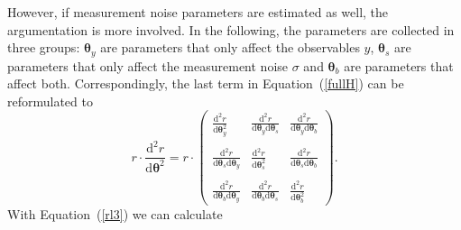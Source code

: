 \documentclass[12pt,a4paper]{scrartcl}
\newcommand{\DDsquare}[2]{\frac{\mathrm{d}^2 #1}{\mathrm{d} #2^2}}
\newcommand{\DDD}[3]{\frac{\mathrm{d}^2 #1}{\mathrm{d} #2\mathrm{d} #3}}
\begin{document}
However, if measurement noise parameters are estimated as well, the argumentation is 
more involved. In the following, the parameters are collected in three groups: $
\boldsymbol{\theta}_y$ are parameters that only affect the observables ${y}$, $
\boldsymbol{\theta}_s$ are parameters that only affect the measurement noise ${\sigma}$ 
and $\boldsymbol{\theta}_{b}$ are parameters that affect both. Correspondingly, the last 
term in Equation~(\ref{fullH}) can be reformulated to
\begin{displaymath}
{r} \cdot \DDsquare{{r}}{\boldsymbol{\theta}} = {r} \cdot \left( 
\begin{array}{ccc}
\DDsquare{{r}}{\boldsymbol{\theta}_y} & \DDD{{r}}{\boldsymbol{\theta}_y}
{\boldsymbol{\theta}_s} & \DDD{{r}}{\boldsymbol{\theta}_y}{\boldsymbol{\theta}_b} \\
\\
\DDD{{r}}{\boldsymbol{\theta}_s}{\boldsymbol{\theta}_y} & \DDsquare{{r}}
{\boldsymbol{\theta}_s} & \DDD{{r}}{\boldsymbol{\theta}_s}{\boldsymbol{\theta}_b} \\
\\
\DDD{{r}}{\boldsymbol{\theta}_b}{\boldsymbol{\theta}_y} & \DDD{{r}}{\boldsymbol{\theta}
_b}{\boldsymbol{\theta}_s} & \DDsquare{{r}}{\boldsymbol{\theta}_b}
\end{array} 
\right).
\end{displaymath}
With Equation~(\ref{rl3}) we can calculate
\end{document}
